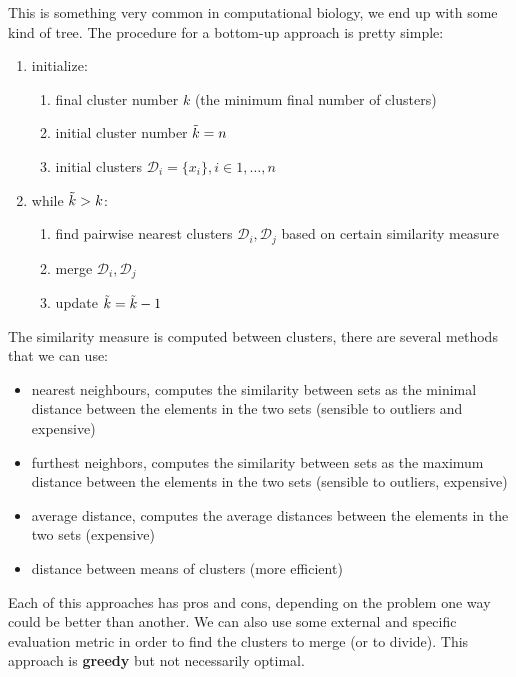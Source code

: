 This is something very common in computational biology, we end up with some kind
of tree. The procedure for a bottom-up approach is pretty simple:
\begin{enumerate}
	\item initialize:
		\begin{enumerate}
			\item final cluster number $k$ (the minimum final number of clusters)

			\item initial cluster number $\Tilde{k}= n$

			\item initial clusters $\mathcal{D}_{i}= \{ x_{i}\}, i \in 1, \dots, n$
		\end{enumerate}

	\item while $\Tilde{k}> k$:
		\begin{enumerate}
			\item find pairwise nearest clusters $\mathcal{D}_{i}, \mathcal{D}_{j}$ based
				on certain similarity measure

			\item merge $\mathcal{D}_{i}, \mathcal{D}_{j}$

			\item update $\Tilde{k}= \Tilde{k}- 1$
		\end{enumerate}
\end{enumerate}

The similarity measure is computed between clusters, there are several methods
that we can use:
\begin{itemize}
	\item nearest neighbours, computes the similarity between sets as the minimal
		distance between the elements in the two sets (sensible to outliers and expensive)

	\item furthest neighbors, computes the similarity between sets as the maximum
		distance between the elements in the two sets (sensible to outliers,
		expensive)

	\item average distance, computes the average distances between the elements in
		the two sets (expensive)

	\item distance between means of clusters (more efficient)
\end{itemize}
Each of this approaches has pros and cons, depending on the problem one way
could be better than another. We can also use some external and specific evaluation
metric in order to find the clusters to merge (or to divide). This approach is
\textbf{greedy} but not necessarily optimal.